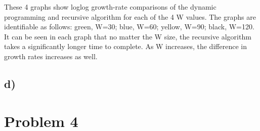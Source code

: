 \documentclass{article}
\begin{document}
These 4 graphs show loglog growth-rate comparisons of the dynamic programming and recursive algorithm for each of the 4 W values. The graphs are identifiable as follows: green, W=30; blue, W=60; yellow, W=90; black, W=120.  It can be seen in each graph that no matter the W size, the recursive algorithm takes a significantly longer time to complete.  As W increases, the difference in growth rates increases as well.

\subsection*{d)}

\section*{Problem 4}
\end{document}
